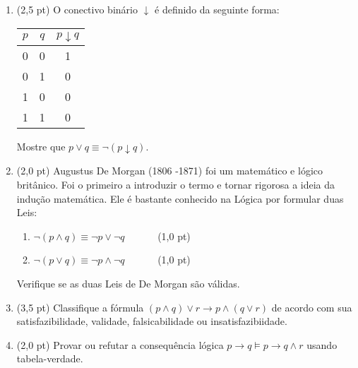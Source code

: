 \documentclass[11pt,a4paper,oneside]{article}
\begin{document}
\begin{enumerate}

	\item (2,5 pt) O conectivo binário $\downarrow$	é definido da seguinte forma:
		\begin{center}
			\begin{tabular}{c|c|c}
			\hline 
			$p$ & $q$ & $p \downarrow q$ \\ 
			\hline 
			0 & 0 & 1 \\ 
			0 & 1 & 0 \\ 
			1 & 0 & 0 \\ 
			1 & 1 & 0 \\ 
			\hline 
			\end{tabular} 
		\end{center}
		
		Mostre que $p \vee q \equiv \neg (p \downarrow q)$.
		
	\item (2,0 pt) Augustus De Morgan (1806 -1871) foi um matemático e lógico britânico. Foi o primeiro a introduzir o termo e tornar rigorosa a ideia da indução matemática. Ele é bastante conhecido na Lógica por formular duas Leis: 

	\begin{enumerate}
		\item $\neg(p \wedge q) \equiv \neg p \vee \neg q$ \ \ \ \ \ \ (1,0 pt)
		\item $\neg(p \vee q) \equiv \neg p \wedge \neg q$ \ \ \ \ \ \ (1,0 pt)
	\end{enumerate} 
	
	Verifique se as duas Leis de De Morgan são válidas.
	
	\item (3,5 pt) Classifique a fórmula $(p \wedge q) \vee r \rightarrow p \wedge (q \vee r)$ de acordo com sua satisfazibilidade, validade, falsicabilidade ou insatisfazibiidade.	
	
	\item (2,0 pt) Provar ou refutar a consequência lógica $p \rightarrow q \models p \rightarrow q \wedge r$ usando tabela-verdade.
	
\end{enumerate}
\end{document}

